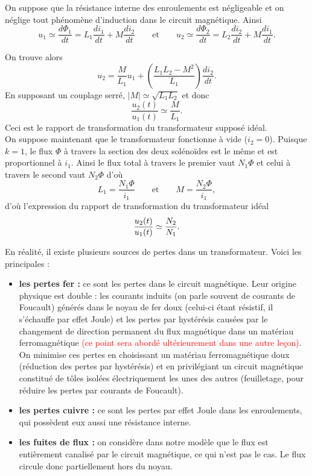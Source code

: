 \documentclass[11pt,a4paper]{report}
\begin{document}
On suppose que la résistance interne des enroulements est négligeable et on néglige tout phénomène d'induction dans le circuit magnétique. Ainsi
\begin{equation}
	u_1 \simeq \frac{d\Phi_1}{dt} = L_1 \frac{d i_1}{dt} + M\frac{d i_2}{dt}  \qquad \text{et} \qquad 
	u_2 \simeq \frac{d\Phi_2}{dt} = L_2 \frac{d i_2}{dt} + M\frac{d i_1}{dt}.
\end{equation}

On trouve alors 
\begin{equation}
	u_2 = \frac{M}{L_1}u_1 + \left(\frac{L_1 L_2 - M^2}{L_1}\right)\frac{di_2}{dt}.
\end{equation}
En supposant un couplage serré, $|M| \simeq \sqrt{L_1 L_2}$ et donc
\begin{equation}
	\frac{u_2(t)}{u_1(t)} \simeq \frac{M}{L_1}.
\end{equation}
Ceci est le rapport de transformation du transformateur supposé idéal.\\

On suppose maintenant que le transformateur fonctionne à vide ($i_2 = 0$). Puisque $k = 1$, le flux $\Phi$ à travers la section des deux solénoïdes est le même et est proportionnel à $i_1$. Ainsi le flux total à travers le premier vaut $N_1\Phi$ et celui à travers le second vaut $N_2\Phi$ d'où
\begin{equation}
	L_1 = \frac{N_1 \Phi}{i_1} \qquad \text{et} \qquad M = \frac{N_2 \Phi}{i_1},
\end{equation}
d'où l'expression du rapport de transformation du transformateur idéal
\begin{equation}
	\frac{u_2(t)}{u_1(t)} \simeq \frac{N_2}{N_1}.\\
\end{equation}

\newpage
En réalité, il existe plusieurs sources de pertes dans un transformateur. Voici les principales :
\begin{itemize}
	\item \textbf{les pertes fer :} ce sont les pertes dans le circuit magnétique. Leur origine physique est double : les courants induits (on parle souvent de courants de Foucault) générés dans le noyau de fer doux (celui-ci étant résistif, il s'échauffe par effet Joule) et les pertes par hystérésis causées par le changement de direction permanent du flux magnétique dans un matériau ferromagnétique \textcolor{red}{(ce point sera abordé ultérieurement dans une autre leçon)}. On minimise ces pertes en choisissant un matériau ferromagnétique doux (réduction des pertes par hystérésis) et en privilégiant un circuit magnétique constitué de tôles isolées électriquement les unes des autres (feuilletage, pour réduire les pertes par courants de Foucault).
	\item \textbf{les pertes cuivre :} ce sont les pertes par effet Joule dans les enroulements, qui possèdent eux aussi une résistance interne.
	\item \textbf{les fuites de flux :} on considère dans notre modèle que le flux est entièrement canalisé par le circuit magnétique, ce qui n'est pas le cas. 
	Le flux circule donc partiellement hors du noyau.
\end{itemize}
\end{document}
